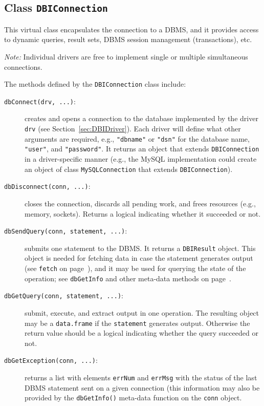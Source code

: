\documentclass{article}
\newcommand{\sfun}[1]{\mbox{\tt #1()}}  %
\newcommand{\sobj}[1]{\mbox{\tt #1}}    %
\newcommand{\sclass}[1]{\mbox{\tt #1}}  %
\newcommand{\smethod}[1]{\mbox{\tt #1}} %
\begin{document}
\subsection{Class \sclass{DBIConnection}}\label{sec:DBIConnection}
This virtual class encapsulates the connection to a DBMS, and
it provides access to dynamic queries, result sets, DBMS session
management (transactions), etc.

\emph{Note:} Individual drivers are free to implement single or
multiple simultaneous connections.

The methods defined by the \sclass{DBIConnection} class include:
\begin{description}
\item[\smethod{dbConnect(drv, ...)}:]\label{meth:dbConnect}
  creates and opens a connection to the database implemented by the
  driver \sobj{drv} (see Section~\ref{sec:DBIDriver}).  Each driver will
  define what other arguments are required, e.g., \sobj{"dbname"} or
  \sobj{"dsn"} for the database name, \sobj{"user"}, and \sobj{"password"}.
  It returns an object that extends \sclass{DBIConnection} in a
  driver-specific manner (e.g., the MySQL implementation could
  create an object of class \sclass{MySQLConnection} that extends 
  \sclass{DBIConnection}).

\item[\smethod{dbDisconnect(conn, ...)}:]
  closes the connection, discards all pending work, and frees
  resources (e.g., memory, sockets).  Returns a logical indicating
  whether it succeeded or not.

\item[\smethod{dbSendQuery(conn, statement, ...)}:]
  submits one statement to the DBMS.  It returns a \sclass{DBIResult}
  object. This object is needed for fetching data in case
  the statement generates output (see \smethod{fetch} on
  page~\pageref{meth:fetch}), and it may be used for querying the
  state of the operation; see \smethod{dbGetInfo} and other 
  meta-data methods on page~\pageref{meth:res-others}.

\item[\smethod{dbGetQuery(conn, statement, ...)}:]
  submit, execute, and extract output in one operation.
  The resulting object may be a \sclass{data.frame} if
  the \sobj{statement} generates output.  Otherwise the
  return value  should be a logical indicating whether
  the query succeeded or not.

\item[\smethod{dbGetException(conn, ...)}:]
  returns a list with elements \sobj{errNum} and \sobj{errMsg}
  with the status of the last DBMS statement sent on a given
  connection (this information may also be provided by the
  \sfun{dbGetInfo} meta-data function on the \sobj{conn} object.


\end{description}
\end{document}
